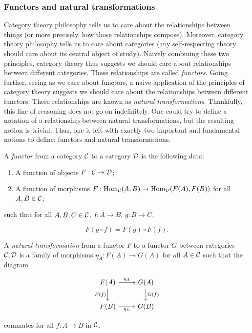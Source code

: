 \subsubsection{Functors and natural transformations}

Category theory philosophy tells us to care about the relationships between things (or more precisely, how those relationships compose). Moreover, category theory philosophy tells us to care about categories (any self-respecting theory should care about its central object of study). Naively combining these two principles, category theory thus suggests we should care about relationships between different categories. These relationships are called {\em functors}. Going further, seeing as we care about functors, a naive application of the principles of category theory suggests we should care about the relationships between different functors. These relationships are known as {\em natural transformations}. Thankfully, this line of reasoning does not go on indefinitely. One could try to define a notation of a relationship between natural transformations, but the resulting notion is trivial. Thus, one is left with exactly two important and fundamental notions to define: functors and natural transformations.

\begin{defn}[Functor] A {\em functor} from a category ${\mathcal C}$ to a category ${\mathcal D}$ is the following data:

\begin{enumerate}
\item A function of objects $ F:{\mathcal C}\to{\mathcal D}$;
\item A function of morphisms $F:\operatorname{Hom}_{{\mathcal C}}(A,B)\to \operatorname{Hom}_{{\mathcal D}}(F(A),F(B))$ for all $A,B\in {\mathcal C}$;
\end{enumerate}

such that for all $A,B,C\in {\mathcal C}$, $f:A\to B$, $g:B\to C$,

$$F(g\circ f)=F(g)\circ F(f).$$
\end{defn}

\begin{defn} A {\em natural transformation} from a functor $F$ to a functor $G$ between categories ${\mathcal C},{\mathcal D}$ is a family of morphisms $\eta_A:F(A)\to G(A)$ for all $A\in {\mathcal C}$ such that the diagram

\[\begin{tikzcd}
	{F(A)} & {G(A)} \\
	{F(B)} & {G(B)}
	\arrow["{\eta_A}", from=1-1, to=1-2]
	\arrow["{F(f)}"', from=1-1, to=2-1]
	\arrow["{G(f)}", from=1-2, to=2-2]
	\arrow["{\eta_B}"', from=2-1, to=2-2]
\end{tikzcd}\]

commutes for all $f:A\to B$ in ${\mathcal C}$.
\end{defn}

